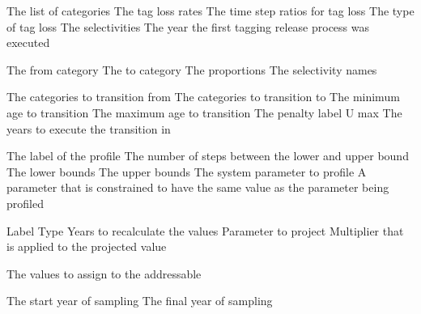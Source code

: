  {}
 {}
\par\textbf{}\par
{} {The list of categories}
 {The tag loss rates}
 {The time step ratios for tag loss}
 {The type of tag loss}
 {The selectivities}
 {The year the first tagging release process was executed}
\par\textbf{}\par
{} {The from category}
 {The to category}
 {The proportions}
 {The selectivity names}
\par\textbf{}\par
{} {The categories to transition from}
 {The categories to transition to}
 {The minimum age to transition}
 {The maximum age to transition}
 {The penalty label}
 {U max}
 {The years to execute the transition in}
\par\par
{} {The label of the profile}
 {The number of steps between the lower and upper bound}
 {The lower bounds}
 {The upper bounds}
 {The system parameter to profile}
 {A parameter that is constrained to have the same value as the parameter being profiled}
\par\par
{} {Label}
 {Type}
 {Years to recalculate the values}
 {Parameter to project}
 {Multiplier that is applied to the projected value}
\par\textbf{}\par
{} {The values to assign to the addressable}
\par\textbf{}\par
{} {The start year of sampling}
 {The final year of sampling}
\par\textbf{}\par
